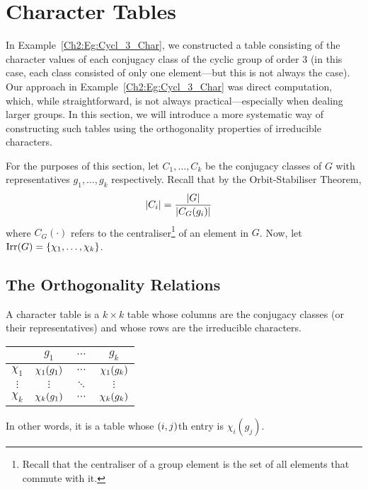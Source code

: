 \section{Character Tables}

In Example~\ref{Ch2:Eg:Cycl_3_Char}, we constructed a table consisting of the character values of each conjugacy class of the cyclic group of order $3$ (in this case, each class consisted of only one element---but this is not always the case). Our approach in Example~\ref{Ch2:Eg:Cycl_3_Char} was direct computation, which, while straightforward, is not always practical---especially when dealing larger groups. In this section, we will introduce a more systematic way of constructing such tables using the orthogonality properties of irreducible characters.

\begin{boxnotation}
    For the purposes of this section, let $C_1, \ldots, C_k$ be the conjugacy classes of $G$ with representatives $g_1, \ldots, g_k$ respectively. Recall that by the Orbit-Stabiliser Theorem,
    \begin{align*}
        \left\lvert C_i \right\rvert &= \frac{\left\lvert G \right\rvert}{\left\lvert C_G(g_i) \right\rvert}
    \end{align*}
    where $C_G(\cdot)$ refers to the centraliser\footnote{Recall that the centraliser of a group element is the set of all elements that commute with it.} of an element in $G$. Now, let $\operatorname{Irr}\!\left( G \right) = \left\{ \chi_1, \ldots, \chi_k \right\}$.
    \end{boxnotation}

\subsection{The Orthogonality Relations}

\begin{boxdefinition}
    A character table is a $k \times k$ table whose columns are the conjugacy classes (or their representatives) and whose rows are the irreducible characters.
    \begin{table}[H]
        \centering
        \begin{tabular}{c|ccc}
            & $g_1$ & $\cdots$ & $g_k$ \\
            \hline
            $\chi_1$ & $\chi_{1}\!\left( g_1 \right)$ & $\cdots$ & $\chi_{1}\!\left( g_k \right)$ \\
            $\vdots$ & $\vdots$ & $\ddots$ & $\vdots$ \\
            $\chi_k$ & $\chi_{k}\!\left( g_1 \right)$ & $\cdots$ & $\chi_{k}\!\left( g_k \right)$
        \end{tabular}
    \end{table}
    In other words, it is a table whose $\left( i,j \right)$th entry is $\chi_i(g_j)$.
\end{boxdefinition}

